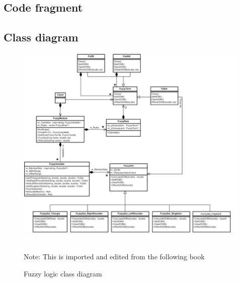 \documentclass[11pt]{extarticle}
\begin{document}
    \subsection{Code fragment}
    
    \subsection{Class diagram}
    
    \begin{figure}[h!]
        \begin{center}
            \includegraphics[width=35em]{FuzzyClassDiagram.png}
        \end{center}
        \begin{center}
        \caption{Fuzzy logic class diagram}
        \\Note: This is imported and edited from the following book \cite{pgaie} %
        \end{center}
        \label{fig:FuzzyClassDiagram}
    \end{figure}


    \newpage
\end{document}
